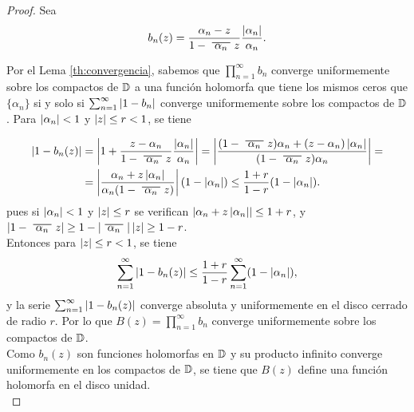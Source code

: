 \begin{proof}
    Sea
    \begin{equation*}
        b_n (z) = \frac{\alpha_n - z}{1 - \xbar{\alpha_n}z} \dfrac{\abs{\alpha_n}}{\alpha_n}.
    \end{equation*}

    Por el Lema \ref{th:convergencia}, sabemos que $\prod_{n=1}^{\infty} b_n$ converge uniformemente sobre los compactos de $\mathbb{D}$ a una función holomorfa que tiene los mismos ceros que $\{\alpha_n\}$ si y solo si $\sum_{n=1}^{\infty} \left\lvert1 - b_n\right\rvert$ converge uniformemente sobre los compactos de $\mathbb{D}$. Para $\left\lvert\alpha_n\right\rvert < 1$ y $\left\lvert z\right\rvert \leq r < 1$, se tiene

    \begin{equation*}
        \begin{split}
            \abs{1 - b_n(z)} & = \abs{1 + \dfrac{z - \alpha_n}{1 - \xbar{\alpha_n}z} \dfrac{\abs{\alpha_n}}{\alpha_n}} = \abs{\dfrac{(1 - \xbar{\alpha_n}z) \alpha_n + (z - \alpha_n) \abs{\alpha_n}}{(1 - \xbar{\alpha_n}z) \alpha_n}} = \\
                             & = \abs{ \dfrac{\alpha_n + z \abs{\alpha_n}}{\alpha_n (1 - \xbar{\alpha_n}z)}} (1 - \abs{\alpha_n}) \leq \dfrac{1 + r}{1 - r} (1 - \abs{\alpha_n}).
        \end{split}
    \end{equation*}
    pues si $\left\lvert\alpha_n\right\rvert < 1$ y $\left\lvert z\right\rvert \leq r$ se verifican $\left\lvert\alpha_n + z \left\lvert\alpha_n\right\rvert\right\rvert \leq 1+r$, y $\abs{1- \xbar{\alpha_n}z} \geq 1-\abs{\xbar{\alpha_n}}\abs{z} \geq 1-r$. \\

    Entonces para $\left\lvert z\right\rvert \leq r < 1$, se tiene
    \begin{equation*}
        \sum_{n=1}^{\infty} \left\lvert1 - b_n(z)\right\rvert \leq \dfrac{1 + r}{1 - r} \sum_{n=1}^{\infty} (1 - \left\lvert\alpha_n\right\rvert),
    \end{equation*}
    y la serie $\sum_{n=1}^{\infty} \left\lvert1 - b_n(z)\right\rvert$ converge absoluta y uniformemente en el disco cerrado de radio $r$. Por lo que $B(z) = \prod_{n=1}^{\infty} b_n$ converge uniformemente sobre los compactos de $\mathbb{D}$. \\

    Como $b_n(z)$ son funciones holomorfas en $\mathbb{D}$ y su producto infinito converge uniformemente en los compactos de $\mathbb{D}$, se tiene que $B(z)$ define una función holomorfa en el disco unidad. \\ %


\end{proof}

